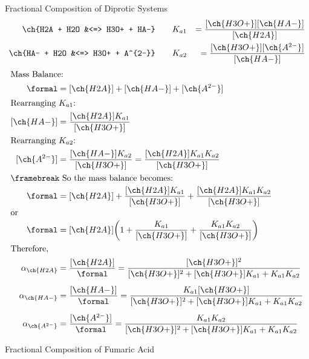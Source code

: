 \documentclass[handout]{beamer}
\begin{document}
\begin{frame}[allowframebreaks]{Fractional Composition of Diprotic Systems}
	\begin{align*}
		\ch{H2A + H2O &<=> H3O+ + HA-} \qquad &K_{a1} &=
		\frac{[\ch{H3O+}][\ch{HA-}]}{[\ch{H2A}]} \\
		\ch{HA- + H2O &<=> H3O+ + A^{2-}} \qquad &K_{a2} &=
		\frac{[\ch{H3O+}][\ch{A^{2-}}]}{[\ch{HA-}]}
	\end{align*}
	\begin{align*}
		\shortintertext{Mass Balance:}
		\si{\formal} &= [\ch{H2A}] + [\ch{HA-}] + [\ch{A^{2-}}] \\
		\shortintertext{Rearranging $K_{a1}$:}
		[\ch{HA-}] &= \frac{[\ch{H2A}]K_{a1}}{[\ch{H3O+}]} \\
		\shortintertext{Rearranging $K_{a2}$:}
		[\ch{A^{2-}}] &= \frac{[\ch{HA-}]K_{a2}}{[\ch{H3O+}]} =
		\frac{[\ch{H2A}]K_{a1}K_{a2}}{[\ch{H3O+}]} \\
		\shortintertext{\framebreak So the mass balance becomes:}
		\si{\formal} &= [\ch{H2A}] +
		\frac{[\ch{H2A}]K_{a1}}{[\ch{H3O+}]} +
		\frac{[\ch{H2A}]K_{a1}K_{a2}}{[\ch{H3O+}]} \\
		\shortintertext{or}
		\si{\formal} &= [\ch{H2A}]\bigg(1 + \frac{K_{a1}}{[\ch{H3O+}]}
		+ \frac{K_{a1}K_{a2}}{[\ch{H3O+}]}\bigg) \\
		\shortintertext{Therefore,}
		\alpha_{\ch{H2A}} &= \frac{[\ch{H2A}]}{\si{\formal}} =
		\frac{[\ch{H3O+}]^2}{[\ch{H3O+}]^2 + [\ch{H3O+}]K_{a1} +
		K_{a1}K_{a2}} \\[0.5em]
		\alpha_{\ch{HA-}} &= \frac{[\ch{HA-}]}{\si{\formal}} =
		\frac{K_{a1}[\ch{H3O+}]}{[\ch{H3O+}]^2 + [\ch{H3O+}]K_{a1} +
		K_{a1}K_{a2}} \\[0.5em]
		\alpha_{\ch{A^{2-}}} &= \frac{[\ch{A^{2-}}]}{\si{\formal}} =
		\frac{K_{a1}K_{a2}}{[\ch{H3O+}]^2 + [\ch{H3O+}]K_{a1} +
		K_{a1}K_{a2}}
	\end{align*}
\end{frame}

\begin{frame}{Fractional Composition of Fumaric Acid}
	\begin{center}
		
	\end{center}
\end{frame}
\end{document}
